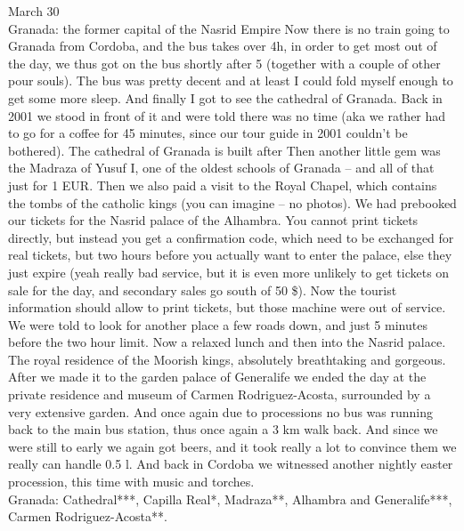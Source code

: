 March 30\\
Granada: the former capital of the Nasrid Empire
Now there is no train going to Granada from Cordoba, and the bus takes over 4h, in order to get most out of the day, we thus got on the bus shortly after 5 (together with a couple of other pour souls). The bus was pretty decent and at least I could fold myself enough to get some more sleep. And finally I got to see the cathedral of Granada. Back in 2001 we stood in front of it and were told there was no time (aka we rather had to go for a coffee for 45 minutes, since our tour guide in 2001 couldn't be bothered). The cathedral of Granada is built after Then another little gem was the Madraza of Yusuf I, one of the oldest schools of Granada -- and all of that just for 1 EUR. Then we also paid a visit to the Royal Chapel, which contains the tombs of the catholic kings (you can imagine -- no photos). We had prebooked our tickets for the Nasrid palace of the Alhambra. You cannot print tickets directly, but instead you get a confirmation code, which need to be exchanged for real tickets, but two hours before you actually want to enter the palace, else they just expire (yeah really bad service, but it is even more unlikely to get tickets on sale for the day, and secondary sales go south of 50 \$). Now the tourist information should allow to print tickets, but those machine were out of service. We were told to look for another place a few roads down, and just 5 minutes before the two hour limit. Now a relaxed lunch and then into the Nasrid palace. The royal residence of the Moorish kings, absolutely breathtaking and gorgeous. After we made it to the garden palace of Generalife we ended the day at the private residence and museum of Carmen Rodriguez-Acosta, surrounded by a very extensive garden. And once again due to processions no bus was running back to the main bus station, thus once again a 3 km walk back. And since we were still to early we again got beers, and it took really a lot to convince them we really can handle 0.5 l. And back in Cordoba we witnessed another nightly easter procession, this time with music and torches.\\

Granada: Cathedral***,
Capilla Real*,
Madraza**,
Alhambra and Generalife***,
Carmen Rodriguez-Acosta**.\\

